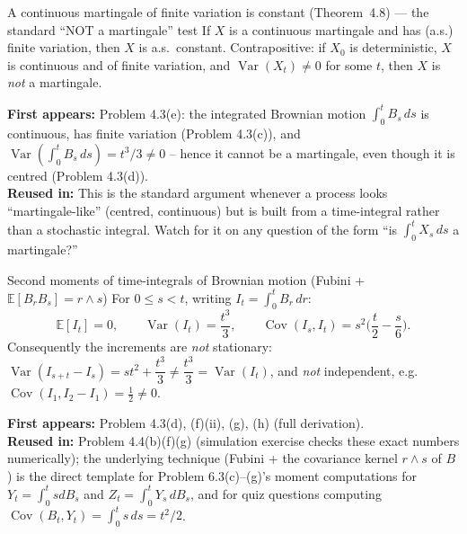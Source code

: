 \documentclass[11pt]{article}
\newcommand{\E}{\mathbb{E}}
\DeclareMathOperator{\Var}{Var}
\DeclareMathOperator{\Cov}{Cov}
\newcommand{\used}[2]{\begin{sourcebox}\textbf{First appears:} #1 \\ \textbf{Reused in:} #2\end{sourcebox}}
\begin{document}
\begin{result}{A continuous martingale of finite variation is constant
(Theorem~4.8) --- the standard ``NOT a martingale'' test}
\label{res:16}
If $X$ is a continuous martingale and has (a.s.) finite variation, then $X$ is
a.s.\ constant. Contrapositive: if $X_0$ is deterministic, $X$ is continuous and
of finite variation, and $\Var(X_t)\ne0$ for some $t$, then $X$ is \emph{not} a
martingale.
\end{result}
\used{Problem 4.3(e): the integrated Brownian motion $\int_0^tB_s\,ds$ is
continuous, has finite variation (Problem 4.3(c)), and $\Var(\int_0^tB_s\,ds)=
t^3/3\ne0$ -- hence it cannot be a martingale, even though it is centred
(Problem 4.3(d)).}{This is the standard argument whenever a process looks
``martingale-like'' (centred, continuous) but is built from a time-integral
rather than a stochastic integral. Watch for it on any question of the form
``is $\int_0^t X_s\,ds$ a martingale?''}

\begin{result}{Second moments of time-integrals of Brownian motion (Fubini +
$\E[B_rB_s]=r\wedge s$)}
\label{res:17}
For $0\le s<t$, writing $I_t=\int_0^tB_r\,dr$:
\[
\E[I_t]=0,\qquad
\Var(I_t)=\frac{t^3}{3},\qquad
\Cov(I_s,I_t)=s^2\Big(\frac t2-\frac s6\Big).
\]
Consequently the increments are \emph{not} stationary:
$\Var(I_{s+t}-I_s)=st^2+\dfrac{t^3}{3}\ne\dfrac{t^3}{3}=\Var(I_t)$,
and \emph{not} independent, e.g.\ $\Cov(I_1,I_2-I_1)=\tfrac12\ne0$.
\end{result}
\used{Problem 4.3(d), (f)(ii), (g), (h) (full derivation).}{Problem 4.4(b)(f)(g)
(simulation exercise checks these exact numbers numerically); the underlying
technique (Fubini + the covariance kernel $r\wedge s$ of $B$) is the direct
template for Problem 6.3(c)--(g)'s moment computations for $Y_t=\int_0^tsdB_s$
and $Z_t=\int_0^tY_s\,dB_s$, and for quiz questions computing
$\Cov(B_t,Y_t)=\int_0^ts\,ds=t^2/2$.}
\end{document}
